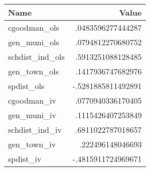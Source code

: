 \begin{tabular}{|l|r|}
\hline
Name & Value \\
\hline
cgoodman_ols & .0483596277444287 \\
gen_muni_ols & .0794812270680752 \\
schdist_ind_ols & .5913251088128485 \\
gen_town_ols & .1417936747682976 \\
spdist_ols & -.5281885811492891 \\
cgoodman_iv & .0770940336170405 \\
gen_muni_iv & .1115426407253849 \\
schdist_ind_iv & .6811022787018657 \\
gen_town_iv & .222496148046693 \\
spdist_iv & -.4815911724969671 \\
\end{tabular}
